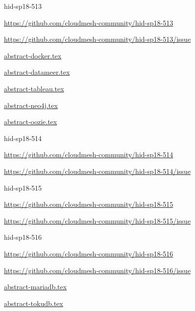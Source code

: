 \begin{IU}

hid-sp18-513

\url{https://github.com/cloudmesh-community/hid-sp18-513}

\url{https://github.com/cloudmesh-community/hid-sp18-513/issue}

\href{https://github.com/cloudmesh-community/hid-sp18-513/blob/master//technology/abstract-docker.tex}{abstract-docker.tex}

\href{https://github.com/cloudmesh-community/hid-sp18-513/blob/master//technology/abstract-datameer.tex}{abstract-datameer.tex}

\href{https://github.com/cloudmesh-community/hid-sp18-513/blob/master//technology/abstract-tableau.tex}{abstract-tableau.tex}

\href{https://github.com/cloudmesh-community/hid-sp18-513/blob/master//technology/abstract-neo4j.tex}{abstract-neo4j.tex}

\href{https://github.com/cloudmesh-community/hid-sp18-513/blob/master//technology/abstract-oozie.tex}{abstract-oozie.tex}

\end{IU}


\begin{IU}

hid-sp18-514

\url{https://github.com/cloudmesh-community/hid-sp18-514}

\url{https://github.com/cloudmesh-community/hid-sp18-514/issue}

\end{IU}


\begin{IU}

hid-sp18-515

\url{https://github.com/cloudmesh-community/hid-sp18-515}

\url{https://github.com/cloudmesh-community/hid-sp18-515/issue}

\end{IU}


\begin{IU}

hid-sp18-516

\url{https://github.com/cloudmesh-community/hid-sp18-516}

\url{https://github.com/cloudmesh-community/hid-sp18-516/issue}

\href{https://github.com/cloudmesh-community/hid-sp18-516/blob/master//technology/abstract-mariadb.tex}{abstract-mariadb.tex}

\href{https://github.com/cloudmesh-community/hid-sp18-516/blob/master//technology/abstract-tokudb.tex}{abstract-tokudb.tex}

\end{IU}


